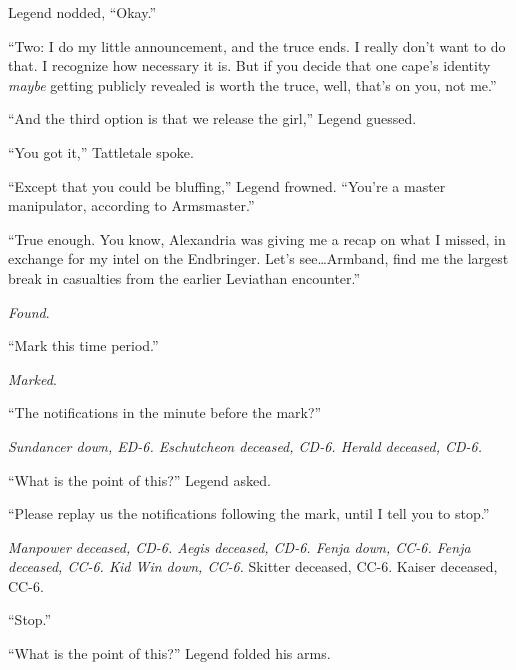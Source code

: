 Legend nodded, ``Okay.''



``Two: I do my little announcement, and the truce ends.  I really don't want to do that.  I recognize how necessary it is.  But if you decide that one cape's identity \emph{maybe} getting publicly revealed is worth the truce, well, that's on you, not me.''



``And the third option is that we release the girl,'' Legend guessed.



``You got it,'' Tattletale spoke.



``Except that you could be bluffing,'' Legend frowned.  ``You're a master manipulator, according to Armsmaster.''



``True enough.  You know, Alexandria was giving me a recap on what I missed, in exchange for my intel on the Endbringer.  Let's see\ldots Armband, find me the largest break in casualties from the earlier Leviathan encounter.''



\emph{Found}.



``Mark this time period.''



\emph{Marked}.



``The notifications in the minute before the mark?''



\emph{Sundancer down, ED-6.  Eschutcheon deceased, CD-6.  Herald deceased, CD-6.}



``What is the point of this?'' Legend asked.



``Please replay us the notifications following the mark, until I tell you to stop.''



\emph{Manpower deceased, CD-6.  Aegis deceased, CD-6.  Fenja down, CC-6.  Fenja deceased, CC-6.  Kid Win down, CC-6.  }Skitter deceased, CC-6. Kaiser deceased, CC-6.



``Stop.''



``What is the point of this?''  Legend folded his arms.



